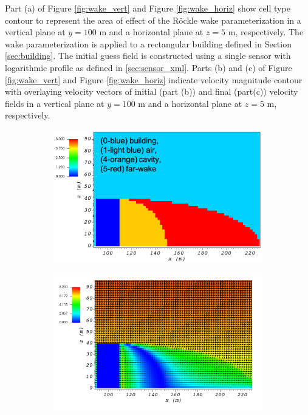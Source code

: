 Part (a) of Figure \ref{fig:wake_vert} and Figure \ref{fig:wake_horiz} show cell type contour to represent the area of effect of the R\"{o}ckle wake parameterization in a vertical plane at $y=100$ m and a horizontal plane at $z=5$ m, respectively. The wake parameterization is applied to a rectangular building defined in Section \ref{sec:building}. The initial guess field is constructed using a single sensor with logarithmic profile as defined in \ref{sec:sensor_xml}. Parts (b) and (c) of Figure \ref{fig:wake_vert} and Figure \ref{fig:wake_horiz} indicate velocity magnitude contour with overlaying velocity vectors of initial (part (b)) and final (part(c)) velocity fields in a vertical plane at $y=100$ m and a horizontal plane at $z=5$ m, respectively.

\begin{figure}[H]
    \centering
    \begin{subfigure}{\textwidth}
    \centering
    \includegraphics[width=10.3cm,keepaspectratio]{Images/wake_y_100_1_init_icell.png}
    \caption{}
    \end{subfigure}
    \begin{subfigure}{\textwidth}
    \centering
    \includegraphics[width=11.0cm,keepaspectratio]{Images/wake_y_100_1_init_vel.png}

\end{subfigure}
\end{figure}
